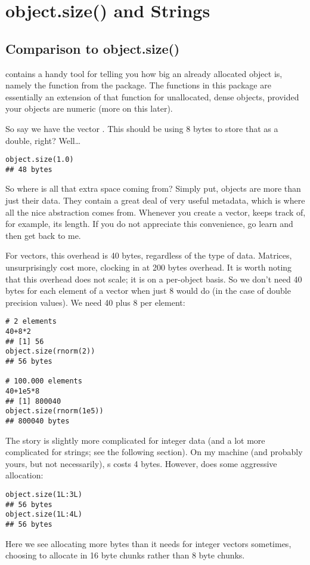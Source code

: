 \section{object.size() and Strings}

\subsection{Comparison to object.size()}

\R contains a handy tool for telling you how big an already allocated 
object is, namely the  function from the  
package.  The functions in this package are essentially an extension of that 
function for unallocated, dense objects, provided your objects are numeric (more 
on this later).

So say we have the vector .  This should be using 8 bytes to 
store that  as a double, right?  Well\dots
\begin{lstlisting}[language=rr]
object.size(1.0)
## 48 bytes
\end{lstlisting}

So where is all that extra space coming from?  Simply put, \R objects 
are more than just their data.  They contain a great deal of very useful 
metadata, which is where all the nice abstraction comes from.  Whenever you 
create a vector, \R keeps track of, for example, its length.  If you 
do not appreciate this convenience, go learn  and then get back to 
me.  

For vectors, this overhead is 40 bytes, regardless of the type of data.   
Matrices, unsurprisingly cost more, clocking in at 200 bytes overhead.  It is 
worth noting that this overhead does not scale; it is on a per-object basis.  So 
we don't need 40 bytes for each element of a vector when just 8 would do (in the 
case of double precision values).  We need 40 plus 8 per element:
\begin{lstlisting}[language=rr]
# 2 elements
40+8*2
## [1] 56
object.size(rnorm(2))
## 56 bytes

# 100.000 elements
40+1e5*8
## [1] 800040
object.size(rnorm(1e5))
## 800040 bytes
\end{lstlisting}

The story is slightly more complicated for integer data (and a lot more 
complicated for strings; see the following section).  On my machine (and 
probably yours, but not necessarily), s costs 4 bytes.  However, 
\R does some aggressive allocation:
\begin{lstlisting}[language=rr]
object.size(1L:3L)
## 56 bytes
object.size(1L:4L)
## 56 bytes
\end{lstlisting}
Here we see \R allocating more bytes than it needs for integer vectors 
sometimes, choosing to allocate in 16 byte chunks rather than 8 byte chunks.

